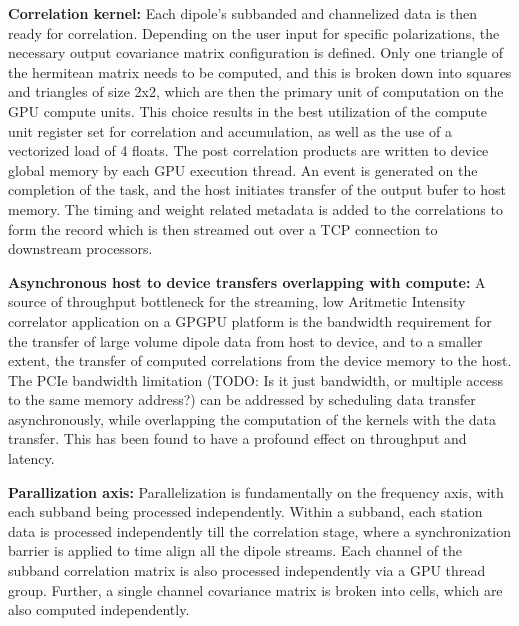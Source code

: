\documentclass{ws-jai}
\begin{document}
\textbf {Correlation  kernel:} Each dipole's  subbanded and channelized  data is
then  ready  for  correlation.   Depending   on  the  user  input  for  specific
polarizations,  the   necessary  output   covariance  matrix   configuration  is
defined. Only  one triangle of  the hermitean matrix  needs to be  computed, and
this is broken down  into squares and triangles of size 2x2,  which are then the
primary unit of computation on the GPU compute units. This choice results in the
best  utilization  of  the  compute   unit  register  set  for  correlation  and
accumulation, as  well as the use  of a vectorized  load of 4 floats.   The post
correlation products are  written to device global memory by  each GPU execution
thread.  An  event is  generated on  the completion  of the  task, and  the host
initiates transfer  of the output  bufer to host  memory. The timing  and weight
related metadata is added  to the correlations to form the  record which is then
streamed out over a TCP connection to downstream processors.

\textbf  {Asynchronous host  to device  transfers overlapping  with compute:}  A
source  of throughput  bottleneck  for the  streaming,  low Aritmetic  Intensity
correlator application on a GPGPU platform  is the bandwidth requirement for the
transfer of  large volume  dipole data  from host  to device,  and to  a smaller
extent, the  transfer of  computed correlations  from the  device memory  to the
host. The  PCIe bandwidth limitation  (TODO: Is  it just bandwidth,  or multiple
access to the same memory address?) can be addressed by scheduling data transfer
asynchronously, while overlapping  the computation of the kernels  with the data
transfer.  This has  been found  to  have a  profound effect  on throughput  and
latency.

\textbf {Parallization axis:} Parallelization  is fundamentally on the frequency
axis, with  each subband being  processed independently. Within a  subband, each
station  data is  processed independently  till the  correlation stage,  where a
synchronization barrier  is applied to time  align all the dipole  streams. Each
channel of the subband correlation matrix  is also processed independently via a
GPU thread  group. Further, a  single channel  covariance matrix is  broken into
cells, which are also computed independently.
\end{document}
